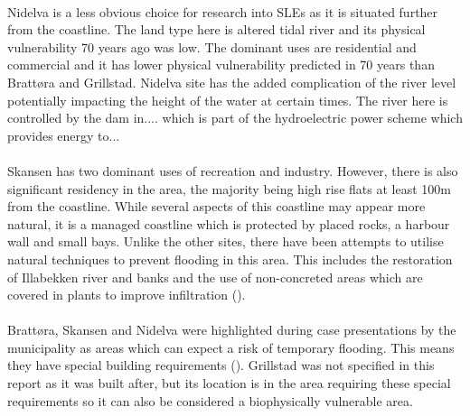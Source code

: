 \paragraph{}
Nidelva is a less obvious choice for research into SLEs as it is situated further from the coastline. The land type here is altered tidal river and its physical vulnerability 70 years ago was low. The dominant uses are residential and commercial and it has lower physical vulnerability predicted in 70 years than Brattøra and Grillstad. Nidelva site has the added complication of the river level potentially impacting the height of the water at certain times. The river here is controlled by the dam in.... which is part of the hydroelectric power scheme which provides energy to...
\paragraph{}
Skansen has two dominant uses of recreation and industry. However, there is also significant residency in the area, the majority being high rise flats at least 100m from the coastline. While several aspects of this coastline may appear more natural, it is a managed coastline which is protected by placed rocks, a harbour wall and small bays. Unlike the other sites, there have been attempts to utilise natural techniques to prevent flooding in this area. This includes the restoration of Illabekken river and banks and the use of non-concreted areas which are covered in plants to improve infiltration (\cite{selliseth_ilabekken_2021}).
\paragraph{}

\paragraph{}
Brattøra, Skansen and Nidelva were highlighted during case presentations by the municipality as areas which can expect a risk of temporary flooding. This means they have special building requirements (\cite{hanssen_saksframlegg_2013}). Grillstad was not specified in this report as it was built after, but its location is in the area requiring these special requirements so it can also be considered a biophysically vulnerable area.  


